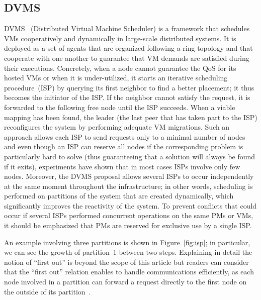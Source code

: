 \subsection{DVMS}\label{ssec:dvms}

DVMS~\cite{quesnel:ispa2013,quesnel:cpe2012} (Distributed Virtual Machine Scheduler) is a
framework that schedules VMs cooperatively and dynamically in large-scale distributed
systems. It is deployed as a set of agents that are organized following a ring topology
and that cooperate with one another to guarantee that VM demands are satisfied during
their executions. Concretely, when a node cannot guarantee the QoS for its hosted VMs or
when it is under-utilized, it starts an iterative scheduling procedure~(ISP) by querying
its first neighbor to find a better placement; it thus becomes the initiator of the ISP.
If the neighbor cannot satisfy the request, it is forwarded to the following free
node until the ISP succeeds. When a viable mapping has been found, the leader (\ie the last
peer that has taken part to the ISP) reconfigures the system by performing adequate VM
migrations. Such an approach allows each ISP to send requests only to a minimal number of
nodes and even though an ISP can reserve all nodes if the corresponding problem is
particularly hard to solve (thus guaranteeing that a solution will always be found if it
exits), experiments have shown that in most cases ISPs involve only few
nodes. Moreover, the DVMS proposal allows several ISPs to occur independently at the same
moment throughout the infrastructure; in other words, scheduling is performed on
partitions of the system that are created dynamically, which significantly improves the
reactivity of the system. To prevent conflicts that could occur if several ISPs performed
concurrent operations on the same PMs or VMs, it should be emphasized that PMs are reserved for
exclusive use by a single ISP.

An example involving three partitions is shown in Figure~\ref{fig:isp}; in particular, we
can see the growth of partition~1 between two steps. Explaining in detail the notion of
``first out'' is beyond the scope of this article but readers can consider that the
``first out'' relation enables to handle communications efficiently, as each node involved
in a partition can forward a request directly to the first node on the outside of its
partition~\cite{quesnel:cpe2012}.

